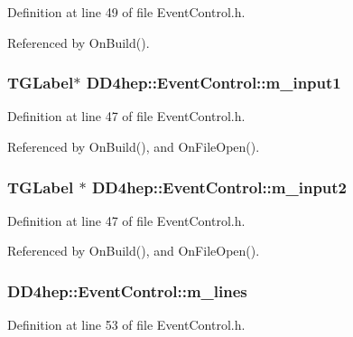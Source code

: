 Definition at line 49 of file EventControl.h.

Referenced by OnBuild().\hypertarget{class_d_d4hep_1_1_event_control_ac057e1afd1f6e5f3490a6e2b35dc6caa}{
\subsubsection[{m\_\-input1}]{\setlength{\rightskip}{0pt plus 5cm}TGLabel$\ast$ {\bf DD4hep::EventControl::m\_\-input1}}}
\label{class_d_d4hep_1_1_event_control_ac057e1afd1f6e5f3490a6e2b35dc6caa}


Definition at line 47 of file EventControl.h.

Referenced by OnBuild(), and OnFileOpen().\hypertarget{class_d_d4hep_1_1_event_control_a1d9b69907b96154bc0cca2b7619b903b}{
\subsubsection[{m\_\-input2}]{\setlength{\rightskip}{0pt plus 5cm}TGLabel $\ast$ {\bf DD4hep::EventControl::m\_\-input2}}}
\label{class_d_d4hep_1_1_event_control_a1d9b69907b96154bc0cca2b7619b903b}


Definition at line 47 of file EventControl.h.

Referenced by OnBuild(), and OnFileOpen().\hypertarget{class_d_d4hep_1_1_event_control_a773981f8dbddb1f17a2f7801a62206bd}{
\subsubsection[{m\_\-lines}]{ {\bf DD4hep::EventControl::m\_\-lines}}}
\label{class_d_d4hep_1_1_event_control_a773981f8dbddb1f17a2f7801a62206bd}


Definition at line 53 of file EventControl.h.

